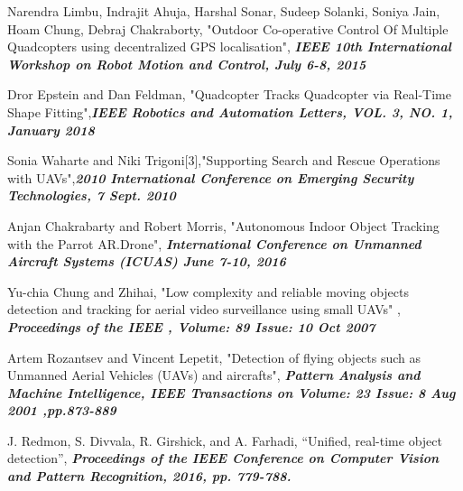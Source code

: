 \documentclass[12pt,a4paper]{report}
\begin{document}
\begin{thebibliography}{99}

\bibitem{}  Narendra Limbu, Indrajit Ahuja, Harshal Sonar, Sudeep Solanki, Soniya Jain, Hoam Chung, Debraj Chakraborty, "Outdoor Co-operative Control Of Multiple Quadcopters using decentralized
GPS localisation", \textbf{\emph{IEEE 10th International Workshop on Robot Motion and Control, July 6-8, 2015 }}

\bibitem{} Dror Epstein and Dan Feldman, "Quadcopter Tracks Quadcopter via Real-Time Shape Fitting",\textbf{\emph{IEEE Robotics and Automation Letters, VOL. 3, NO. 1, January 2018} }

\bibitem{}  Sonia Waharte and Niki Trigoni[3],"Supporting Search and Rescue Operations with
UAVs",\textbf{\emph{2010 International Conference on Emerging Security Technologies, 7 Sept. 2010}}

\bibitem{} Anjan Chakrabarty and Robert Morris, "Autonomous Indoor Object Tracking with the Parrot AR.Drone", \textbf{\emph{International Conference on Unmanned Aircraft Systems (ICUAS) June 7-10, 2016}}

\bibitem{} Yu-chia Chung and Zhihai, "Low complexity and reliable moving objects detection and tracking for aerial video surveillance using small UAVs" , \textbf{\emph{Proceedings of
the IEEE , Volume: 89 Issue: 10 Oct 2007}}

\bibitem{}  Artem Rozantsev and Vincent Lepetit, "Detection of flying objects such as Unmanned Aerial Vehicles (UAVs) and aircrafts", \textbf{\emph{Pattern Analysis and Machine Intelligence,
IEEE Transactions on Volume: 23 Issue: 8 Aug 2001
,pp.873-889 }}

\bibitem{} J. Redmon, S. Divvala, R. Girshick, and A. Farhadi, “Unified, real-time object detection”, \textbf{\emph{ Proceedings of the IEEE Conference on Computer Vision and Pattern Recognition, 2016, pp. 779-788.}}


\end{thebibliography}
\end{document}
